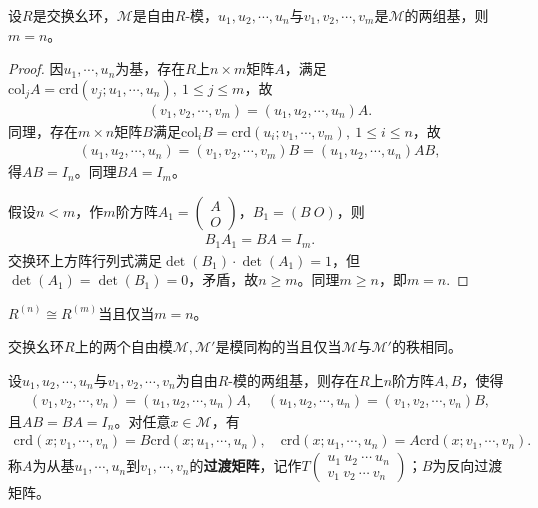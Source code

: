 \documentclass[../../main.tex]{subfiles}%
\begin{document}
\begin{theorem}
设$R$是交换幺环，$\mathscr{M}$是自由$R$-模，$u_1,u_2,\cdots,u_n$与$v_1,v_2,\cdots,v_m$是$\mathscr{M}$的两组基，则$m=n$。
\end{theorem}

\begin{proof}
因$u_1,\cdots,u_n$为基，存在$R$上$n\times m$矩阵$A$，满足$\mathrm{col}_j A=\mathrm{crd}(v_j;u_1,\cdots,u_n),\ 1\leqslant j\leqslant m$，故
\begin{align*}
(v_1,v_2,\cdots,v_m)=(u_1,u_2,\cdots,u_n)A.
\end{align*}
同理，存在$m\times n$矩阵$B$满足$\mathrm{col}_i B=\mathrm{crd}(u_i;v_1,\cdots,v_m),\ 1\leqslant i\leqslant n$，故
\begin{align*}
(u_1,u_2,\cdots,u_n)=(v_1,v_2,\cdots,v_m)B=(u_1,u_2,\cdots,u_n)AB,
\end{align*}
得$AB=I_n$。同理$BA=I_m$。

假设$n<m$，作$m$阶方阵$A_1=\begin{pmatrix}A\\O\end{pmatrix}$，$B_1=(B\ O)$，则
\begin{align*}
B_1 A_1=BA=I_m.
\end{align*}
交换环上方阵行列式满足$\det(B_1)\cdot\det(A_1)=1$，但$\det(A_1)=\det(B_1)=0$，矛盾，故$n\geqslant m$。同理$m\geqslant n$，即$m=n$.
\end{proof}

\begin{corollary}
$R^{(n)}\cong R^{(m)}$当且仅当$m=n$。
\end{corollary}

\begin{corollary}
交换幺环$R$上的两个自由模$\mathscr{M},\mathscr{M}'$是模同构的当且仅当$\mathscr{M}$与$\mathscr{M}'$的秩相同。
\end{corollary}

\begin{corollary}
设$u_1,u_2,\cdots,u_n$与$v_1,v_2,\cdots,v_n$为自由$R$-模的两组基，则存在$R$上$n$阶方阵$A,B$，使得
\begin{align*}
(v_1,v_2,\cdots,v_n)=(u_1,u_2,\cdots,u_n)A,\quad (u_1,u_2,\cdots,u_n)=(v_1,v_2,\cdots,v_n)B,
\end{align*}
且$AB=BA=I_n$。对任意$x\in\mathscr{M}$，有
\begin{align*}
\mathrm{crd}(x;v_1,\cdots,v_n)=B\mathrm{crd}(x;u_1,\cdots,u_n),\quad \mathrm{crd}(x;u_1,\cdots,u_n)=A\mathrm{crd}(x;v_1,\cdots,v_n).
\end{align*}
称$A$为从基$u_1,\cdots,u_n$到$v_1,\cdots,v_n$的\textbf{过渡矩阵}，记作$T\begin{pmatrix}u_1\ u_2\ \cdots\ u_n\\v_1\ v_2\ \cdots\ v_n\end{pmatrix}$；$B$为反向过渡矩阵。
\end{corollary}
\end{document}
